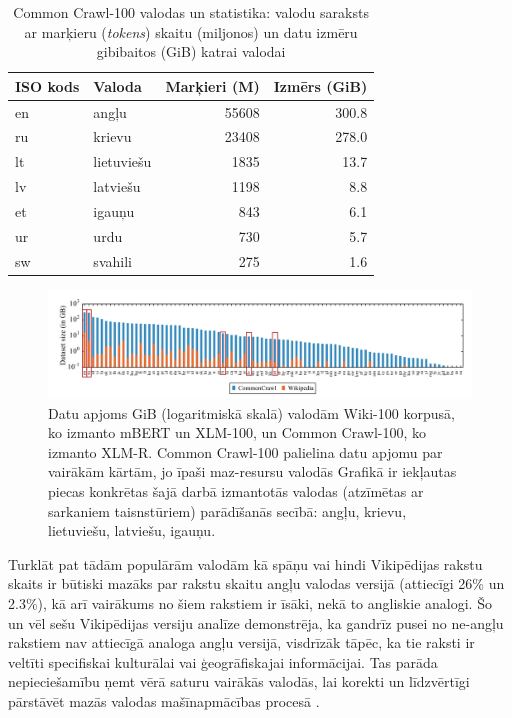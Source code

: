 \begin{table}[htbp]
    \centering
    \caption{Common Crawl-100 valodas un statistika: valodu saraksts ar marķieru (\textit{tokens}) skaitu (miljonos) un datu izmēru gibibaitos (GiB) katrai valodai}
    \begin{tabular}{llrr}
        \toprule
        ISO kods & Valoda     & Marķieri (M) & Izmērs (GiB) \\\midrule
        en       & angļu      & 55608        & 300.8        \\
        ru       & krievu     & 23408        & 278.0        \\
        lt       & lietuviešu & 1835         & 13.7         \\
        lv       & latviešu   & 1198         & 8.8          \\
        et       & igauņu     & 843          & 6.1          \\
        ur       & urdu       & 730          & 5.7          \\
        sw       & svahili    & 275          & 1.6          \\\bottomrule
    \end{tabular}
    \label{tab:cc-100}
\end{table}

\begin{figure}[h]
    \centering
    \includegraphics[width=\textwidth]{figures/dataset-size.png}
    \caption{Datu apjoms GiB (logaritmiskā skalā) valodām Wiki-100 korpusā, ko izmanto mBERT un XLM-100, un Common Crawl-100, ko izmanto XLM-R. Common Crawl-100 palielina datu apjomu par vairākām kārtām, jo īpaši maz-resursu valodās \cite{conneau2020} Grafikā ir iekļautas piecas konkrētas šajā darbā izmantotās valodas (atzīmētas ar sarkaniem taisnstūriem) parādīšanās secībā: angļu, krievu, lietuviešu, latviešu, igauņu.}
    \label{fig:dataset-size}
\end{figure}



Turklāt pat tādām populārām valodām kā spāņu vai hindi Vikipēdijas rakstu skaits ir būtiski mazāks par rakstu skaitu angļu valodas versijā (attiecīgi 26\% un 2.3\%), kā arī vairākums no šiem rakstiem ir īsāki, nekā to angliskie analogi. Šo un vēl sešu Vikipēdijas versiju analīze demonstrēja, ka gandrīz pusei no ne-angļu rakstiem nav attiecīgā analoga angļu versijā, visdrīzāk tāpēc, ka tie raksti ir veltīti specifiskai kulturālai vai ģeogrāfiskajai informācijai. Tas parāda nepieciešamību ņemt vērā saturu vairākās valodās, lai korekti un līdzvērtīgi pārstāvēt mazās valodas mašīnapmācības procesā \cite{roy2020}.


